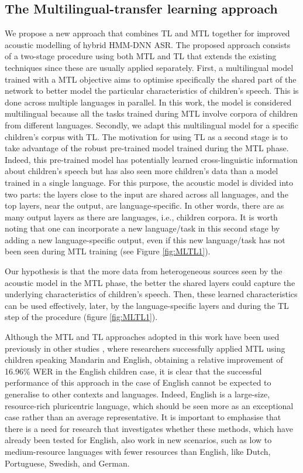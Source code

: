 \subsection{The Multilingual-transfer learning approach}
\label{section:method}

We propose a new approach that combines \ac{TL} and \ac{MTL} together for improved acoustic modelling of hybrid \ac{HMM-DNN} \ac{ASR}. The proposed approach consists of a two-stage procedure using both \ac{MTL} and \ac{TL} that extends the existing techniques since these are usually applied separately. First, a multilingual model trained with a \ac{MTL} objective aims to optimise specifically the shared part of the network to better model the particular characteristics of children's speech. This is done across multiple languages in parallel. In this work, the model is considered multilingual because all the tasks trained during \ac{MTL} involve corpora of children from different languages.
Secondly, we adapt this multilingual model for a specific children's corpus with \ac{TL}. The motivation for using \ac{TL} as a second stage is to take advantage of the robust pre-trained model trained during the \ac{MTL} phase. Indeed, this pre-trained model has potentially learned cross-linguistic information about children's speech but has also seen more children's data than a model trained in a single language. 
For this purpose, the acoustic model is divided into two parts: the layers close to the input are shared across all languages, and the top layers, near the output, are language-specific. In other words, there are as many output layers as there are languages, i.e., children corpora. It is worth noting that one can incorporate a new language/task in this second stage by adding a new language-specific output, even if this new language/task has not been seen during \ac{MTL} training (see Figure \ref{fig:MLTL1}).

Our hypothesis is that the more data from heterogeneous sources seen by the acoustic model in the \ac{MTL} phase, the better the shared layers could capture the underlying characteristics of children's speech. Then, these learned characteristics can be used effectively, later, by the language-specific layers and during the \ac{TL} step of the procedure (figure \ref{fig:MLTL1}). 

Although the \ac{MTL} and \ac{TL} approaches adopted in this work have been used previously in other studies \cite{TransferLF,2019multi}, where researchers successfully applied \ac{MTL} using children speaking Mandarin and English, obtaining a relative improvement of 16.96\% \ac{WER} in the English children case, it is clear that the successful performance of this approach in the case of English cannot be expected to generalise to other contexts and languages. Indeed, English is a large-size, resource-rich pluricentric language, which should be seen more as an exceptional case rather than an average representative. It is important to emphasise that there is a need for research that investigates whether these methods, which have already been tested for English, also work in new scenarios, such as low to medium-resource languages with fewer resources than English, like Dutch, Portuguese, Swedish, and German.


